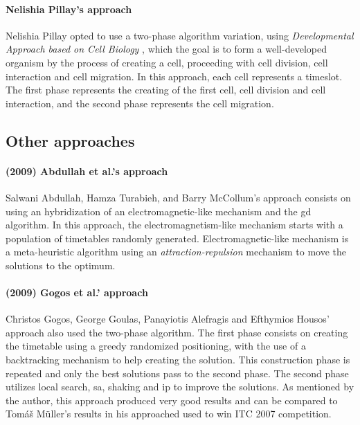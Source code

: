 \paragraph{Nelishia Pillay's approach}
Nelishia Pillay opted to use a two-phase algorithm variation, using \textit{Developmental Approach based on Cell Biology} \cite{Pillay2007}, which the goal is to form a well-developed organism by the process of creating a cell, proceeding with cell division, cell interaction and cell migration. In this approach, each cell represents a timeslot. The first phase represents the creating of the first cell, cell division and cell interaction, and the second phase represents the cell migration.

\subsection{Other approaches}
\label{subsection:OtherAppr}

\paragraph{(2009) Abdullah et al.'s approach}
Salwani Abdullah, Hamza Turabieh, and Barry McCollum's approach \cite{Abdullah2009} consists on using an hybridization of an electromagnetic-like mechanism and the \gls{gd} algorithm. In this approach, the electromagnetism-like mechanism starts with a population of timetables randomly generated. Electromagnetic-like mechanism is a meta-heuristic algorithm using an \textit{attraction-repulsion} mechanism \cite{Javadian2008} to move the solutions to the optimum.\\

\paragraph{(2009) Gogos et al.' approach}
Christos Gogos, George Goulas, Panayiotis Alefragis and Efthymios Housos' approach \cite{Gogos2009} also used the two-phase algorithm. The first phase consists on creating the timetable using a greedy randomized positioning, with the use of a backtracking mechanism to help creating the solution. This construction phase is repeated and only the best solutions pass to the second phase. The second phase utilizes local search, \gls{sa}, shaking and \gls{ip} to improve the solutions. As mentioned by the author, this approach produced very good results  and can be compared to Tom\'{a}\v{s} M\"{u}ller's results in his approached used to win ITC 2007 competition.\\

